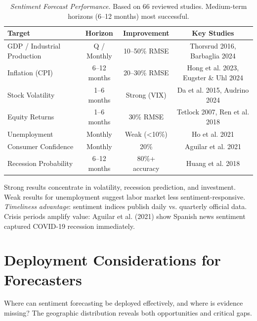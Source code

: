 \documentclass[11pt]{article}
\begin{document}
\begin{table}[H]
\centering \small
\begin{tabular}{lccc}
\toprule
\textbf{Target} & \textbf{Horizon} & \textbf{Improvement} & \textbf{Key Studies} \\
\midrule
GDP / Industrial Production & Q / Monthly & 10--50\% RMSE & Thorsrud 2016, Barbaglia 2024 \\
Inflation (CPI) & 6--12 months & 20--30\% RMSE & Hong et al. 2023, Eugster \& Uhl 2024 \\
Stock Volatility & 1--6 months & Strong (VIX) & Da et al. 2015, Audrino 2024 \\
Equity Returns & 1--6 months & 30\% RMSE & Tetlock 2007, Ren et al. 2018 \\
Unemployment & Monthly & Weak (<10\%) & Ho et al. 2021 \\
Consumer Confidence & Monthly & 20\% & Aguilar et al. 2021 \\
Recession Probability & 6--12 months & 80\%+ accuracy & Huang et al. 2018 \\
\bottomrule
\end{tabular}
\caption{\textit{Sentiment Forecast Performance.} Based on 66 reviewed studies. Medium-term horizons (6--12 months) most successful.}
\label{tab:perf}
\end{table}

Strong results concentrate in volatility, recession prediction, and investment. Weak results for unemployment suggest labor market less sentiment-responsive. \textit{Timeliness advantage}: sentiment indices publish daily vs. quarterly official data. Crisis periods amplify value: Aguilar et al. (2021) show Spanish news sentiment captured COVID-19 recession immediately.

\section{Deployment Considerations for Forecasters}

Where can sentiment forecasting be deployed effectively, and where is evidence missing? The geographic distribution reveals both opportunities and critical gaps.
\end{document}
